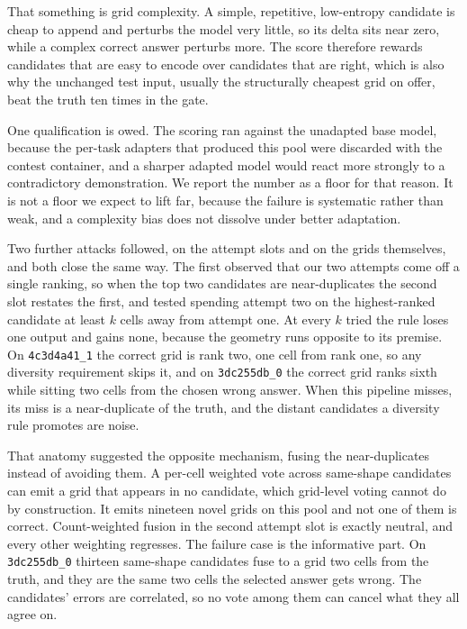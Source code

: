 \documentclass[11pt]{article}
\begin{document}
That something is grid complexity. A simple, repetitive, low-entropy candidate is cheap to append and
perturbs the model very little, so its delta sits near zero, while a complex correct answer perturbs more.
The score therefore rewards candidates that are easy to encode over candidates that are right, which is
also why the unchanged test input, usually the structurally cheapest grid on offer, beat the truth ten
times in the gate.

One qualification is owed. The scoring ran against the unadapted base model, because the per-task adapters
that produced this pool were discarded with the contest container, and a sharper adapted model would react
more strongly to a contradictory demonstration. We report the number as a floor for that reason. It is not
a floor we expect to lift far, because the failure is systematic rather than weak, and a complexity bias
does not dissolve under better adaptation.

Two further attacks followed, on the attempt slots and on the grids themselves, and both close the same
way. The first observed that our two attempts come off a single ranking, so when the top two candidates are
near-duplicates the second slot restates the first, and tested spending attempt two on the highest-ranked
candidate at least $k$ cells away from attempt one. At every $k$ tried the rule loses one output and gains
none, because the geometry runs opposite to its premise. On \texttt{4c3d4a41\_1} the correct grid is rank
two, one cell from rank one, so any diversity requirement skips it, and on \texttt{3dc255db\_0} the correct
grid ranks sixth while sitting two cells from the chosen wrong answer. When this pipeline misses, its miss
is a near-duplicate of the truth, and the distant candidates a diversity rule promotes are noise.

That anatomy suggested the opposite mechanism, fusing the near-duplicates instead of avoiding them. A
per-cell weighted vote across same-shape candidates can emit a grid that appears in no candidate, which
grid-level voting cannot do by construction. It emits nineteen novel grids on this pool and not one of them
is correct. Count-weighted fusion in the second attempt slot is exactly neutral, and every other weighting
regresses. The failure case is the informative part. On \texttt{3dc255db\_0} thirteen same-shape candidates
fuse to a grid two cells from the truth, and they are the same two cells the selected answer gets wrong.
The candidates' errors are correlated, so no vote among them can cancel what they all agree on.
\end{document}

